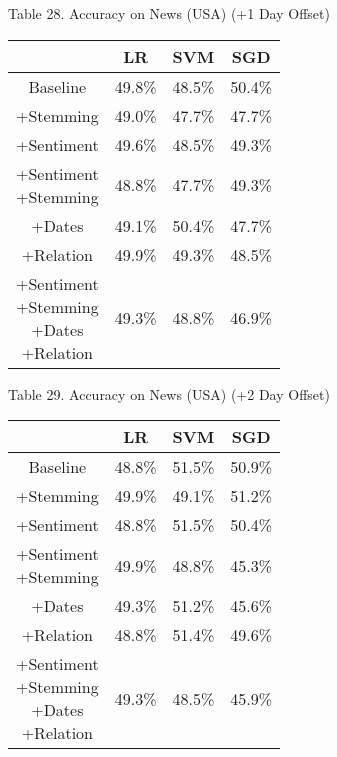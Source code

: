 \documentclass[11pt,a4paper]{article}
\begin{document}
\begin{center}
Table 28. Accuracy on News (USA) (+1 Day Offset)\\
\begin{tabular}{ |c|c|c|c| }
 \hline
  & LR & SVM & SGD \\
  \hline
  Baseline & 49.8\% & 48.5\% & 50.4\% \\
  \hline
 +Stemming & 49.0\% & 47.7\% & 47.7\% \\
  \hline
 +Sentiment & 49.6\% & 48.5\% & 49.3\% \\
  \hline
  \shortstack{+Sentiment \\ +Stemming} & 48.8\% & 47.7\% & 49.3\%\\
 \hline
 +Dates & 49.1\% & 50.4\% & 47.7\% \\
  \hline
 +Relation & 49.9\% & 49.3\% & 48.5\% \\
  \hline
  \shortstack{+Sentiment \\ +Stemming \\+Dates \\+Relation} & 49.3\% & 48.8\% & 46.9\% \\
 \hline
\end{tabular}
\end{center}

\begin{center}
Table 29. Accuracy on News (USA) (+2 Day Offset)\\
\begin{tabular}{ |c|c|c|c| }
 \hline
  & LR & SVM & SGD \\
  \hline
  Baseline & 48.8\% & 51.5\% & 50.9\% \\
  \hline
 +Stemming & 49.9\% & 49.1\% & 51.2\% \\
  \hline
 +Sentiment & 48.8\% & 51.5\% & 50.4\% \\
  \hline
  \shortstack{+Sentiment \\ +Stemming} & 49.9\% & 48.8\% & 45.3\%\\
 \hline
 +Dates & 49.3\% & 51.2\% & 45.6\% \\
  \hline
 +Relation & 48.8\% & 51.4\% & 49.6\% \\
  \hline
  \shortstack{+Sentiment \\ +Stemming \\+Dates \\+Relation} & 49.3\% & 48.5\% & 45.9\% \\
 \hline
\end{tabular}
\end{center}
\end{document}
